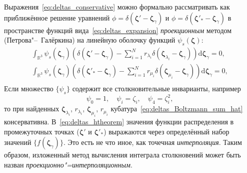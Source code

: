 \documentclass{article}
\newcommand{\dd}{\mathrm{d}}
\newcommand{\dzeta}{\boldsymbol{\dd\zeta}}
\newcommand{\bzeta}{\boldsymbol{\zeta}}
\begin{document}
Выражения~\eqref{eq:deltas_conservative} можно формально рассматривать как приближённое решение уравнений
\(\phi=\delta(\bzeta'-\bzeta_\gamma)\) и \(\phi=\delta(\bzeta'_*-\bzeta_\gamma)\)
в пространстве функций вида~\eqref{eq:deltas_expansion}
\emph{проекционным} методом (Петрова"--~Галёркина) на линейную оболочку функций \(\psi_s(\bzeta)\):
\begin{gather}
    \int_{\mathbb{R}^3} \psi_s(\bzeta_\gamma) \left( \delta(\bzeta'-\bzeta_\gamma)
        - \sum_{i=1}^N r_{\lambda_i} \delta(\bzeta_{\lambda_i}-\bzeta_\gamma) \right) \dzeta_\gamma = 0, \label{eq:lambda_galerkin}\\
    \int_{\mathbb{R}^3} \psi_s(\bzeta_\gamma) \left( \delta(\bzeta'_*-\bzeta_\gamma)
        - \sum_{i=1}^N r_{\mu_i} \delta(\bzeta_{\mu_i}-\bzeta_\gamma) \right) \dzeta_\gamma = 0, \label{eq:mu_galerkin}\\
\end{gather}
Если множество \(\{\psi_s\}\) содержит все столкновительные инварианты, например
\begin{equation}\label{eq:collision_invariants}
    \psi_0 = 1, \quad \psi_i = \zeta_i, \quad \psi_4 = \zeta_i^2,
\end{equation}
то при найденных \(\bzeta_{\lambda_i}\), \(r_{\lambda_i}\), \(\bzeta_{\mu_i}\), \(r_{\mu_i}\)
кубатура~\eqref{eq:deltas_Boltzmann_sum_hat} консервативна.
В~\eqref{eq:deltas_htheorem} значения функции распределения в промежуточных точках (\(\bzeta'\) и \(\bzeta'_*\))
выражаются через определённый набор значений \(\{f(\bzeta_\gamma)\}\).
Это есть не что иное, как точечная \emph{интерполяция}.
Таким образом, изложенный метод вычисления интеграла столкновений может быть назван \emph{проекционно"=интерполяционным}.
\end{document}
